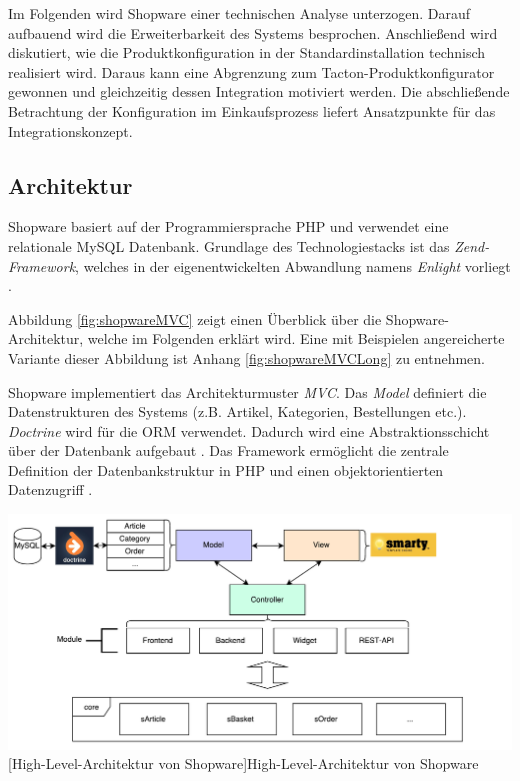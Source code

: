 \documentclass[11pt, a4paper, titlepage, listof=totoc, bibliography=totoc, index=totoc, twoside, openright, headings=normal, draft]{scrreprt}
\begin{document}
Im Folgenden wird Shopware einer technischen Analyse unterzogen. Darauf aufbauend wird die Erweiterbarkeit des Systems besprochen. Anschließend wird diskutiert, wie die Produktkonfiguration in der Standardinstallation technisch realisiert wird. Daraus kann eine Abgrenzung zum Tacton-Produktkonfigurator gewonnen und gleichzeitig dessen Integration motiviert werden. Die abschließende Betrachtung der Konfiguration im Einkaufsprozess liefert Ansatzpunkte für das Integrationskonzept.

\subsection{Architektur}
\label{shopwareArchitektur}
Shopware basiert auf der Programmiersprache PHP und verwendet eine relationale MySQL Datenbank. Grundlage des Technologiestacks ist das \emph{Zend-Framework}, welches in der eigenentwickelten Abwandlung namens \emph{Enlight} vorliegt \citep{shopware5Docs}.

Abbildung \ref{fig:shopwareMVC} zeigt einen Überblick über die Shopware-Architektur, welche im Folgenden erklärt wird. Eine mit Beispielen angereicherte Variante dieser Abbildung ist Anhang \ref{fig:shopwareMVCLong} zu entnehmen.

Shopware implementiert das Architekturmuster \emph{\ac{MVC}}. Das \emph{Model} definiert die Datenstrukturen des Systems (z.B. Artikel, Kategorien, Bestellungen etc.). \emph{Doctrine} wird für die \ac{ORM} verwendet. Dadurch wird eine Abstraktionsschicht über der Datenbank aufgebaut \citep{shopware5Docs}. Das Framework ermöglicht die zentrale Definition der Datenbankstruktur in PHP und einen objektorientierten Datenzugriff \citep{shopware4Docs}.

\vspace{1em}
\begin{minipage}{\linewidth}
	\centering
	\includegraphics[width=1\linewidth]{Abbildungen/shopwareMVCShort.pdf}
	[High-Level-Architektur von Shopware]{High-Level-Architektur von Shopware}
	\label{fig:shopwareMVC}
\end{minipage}
\vspace{0.3em}
\end{document}
